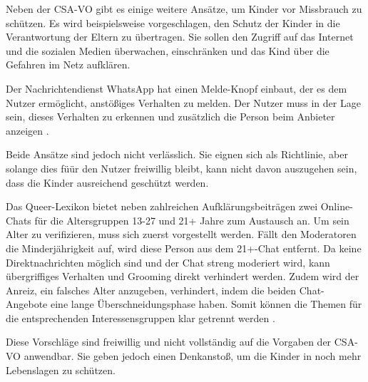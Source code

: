 Neben der \ac{CSA-VO} gibt es einige weitere Ansätze, um Kinder vor Missbrauch zu schützen. Es wird beispielsweise vorgeschlagen, den Schutz der Kinder in die Verantwortung der Eltern zu übertragen. Sie sollen den Zugriff auf das Internet und die sozialen Medien überwachen, einschränken und das Kind über die Gefahren im Netz aufklären.

Der Nachrichtendienst WhatsApp hat einen Melde-Knopf einbaut, der es dem Nutzer ermöglicht, anstößiges Verhalten zu melden. Der Nutzer muss in der Lage sein, dieses Verhalten zu erkennen und zusätzlich die Person beim Anbieter anzeigen \cite{whatsapp:meldeButton}.

Beide Ansätze sind jedoch nicht verlässlich. Sie eignen sich als Richtlinie, aber solange dies füür den Nutzer freiwillig bleibt, kann nicht davon auszugehen sein, dass die Kinder ausreichend geschützt werden.

Das Queer-Lexikon bietet neben zahlreichen Aufklärungsbeiträgen zwei Online-Chats für die Altersgruppen 13-27 und 21+ Jahre zum Austausch an. Um sein Alter zu verifizieren, muss sich zuerst vorgestellt werden. Fällt den Moderatoren die Minderjährigkeit auf, wird diese Person aus dem 21+-Chat entfernt. Da keine Direktnachrichten möglich sind und der Chat streng moderiert wird, kann übergriffiges Verhalten und Grooming direkt verhindert werden. Zudem wird der Anreiz, ein falsches Alter anzugeben, verhindert, indem die beiden Chat-Angebote eine lange Überschneidungsphase haben. Somit können die Themen für die entsprechenden Interessensgruppen klar getrennt werden \cite{queer_lexikon:2023}.

Diese Vorschläge sind freiwillig und nicht vollständig auf die Vorgaben der \ac{CSA-VO} anwendbar. Sie geben jedoch einen Denkanstoß, um die Kinder in noch mehr Lebenslagen zu schützen.


